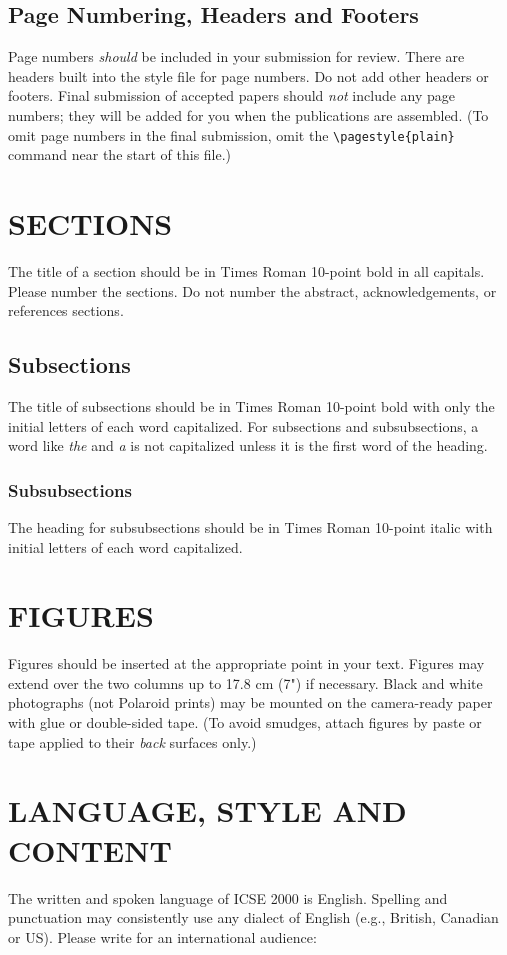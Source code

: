 \subsection{Page Numbering, Headers and Footers}
Page numbers {\it should} be included in your submission for review. 
There are headers built into the style file for page numbers.
Do not add other headers or footers.
Final submission of accepted papers should {\it not} include any 
page numbers; they will be added for you when the 
publications are assembled.  (To omit page numbers in the final
submission, omit the \verb|\pagestyle{plain}| command
near the start of this file.)

\section{SECTIONS}
The title of a section should be in Times Roman 10-point 
bold in all capitals. Please number the sections.  Do not
number the abstract, acknowledgements, or references sections.

\subsection{Subsections}
The title of subsections should be in Times Roman 10-point 
bold with only the initial letters of each word capitalized. 
For subsections and subsubsections, a word like {\it the} and {\it a} 
is not capitalized unless it is the first word of the heading.

\subsubsection{Subsubsections}
The heading for subsubsections should be in Times Roman 
10-point italic with initial letters of each word capitalized.
 
\section{FIGURES}
Figures should be inserted at the appropriate point in your 
text. Figures may extend over the two columns up to 17.8 
cm (7") if necessary. Black and white photographs (not 
Polaroid prints) may be mounted on the camera-ready paper 
with glue or double-sided tape. (To avoid smudges, attach 
figures by paste or tape applied to their {\it back} surfaces only.)

\section{LANGUAGE, STYLE AND CONTENT}
The written and spoken language of ICSE 2000 is English. 
Spelling and punctuation may consistently use any dialect 
of English (e.g., British, Canadian or US). Please write for 
an international audience:
 
